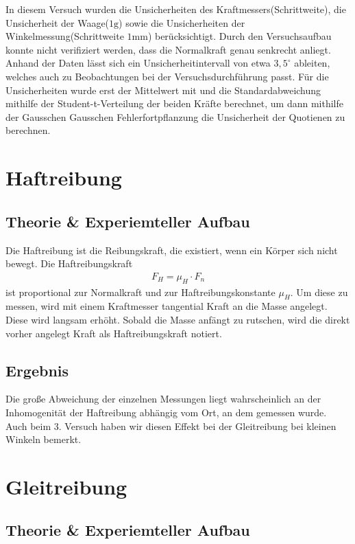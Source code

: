 \documentclass[11pt, a4paper]{article}
\begin{document}
    In diesem Versuch wurden die Unsicherheiten des Kraftmessers(Schrittweite), die Unsicherheit der Waage($1\si{\gram}$)
    sowie die Unsicherheiten der Winkelmessung(Schrittweite $1 \si{\milli\metre}$) berücksichtigt.
    Durch den Versuchsaufbau konnte nicht verifiziert werden, dass die Normalkraft genau senkrecht anliegt.
    Anhand der Daten lässt sich ein Unsicherheitintervall von etwa $3,5^{\circ}$ ableiten, welches auch zu
    Beobachtungen bei der Versuchsdurchführung passt. Für die Unsicherheiten wurde erst der Mittelwert \cite[(29)]{ABW} mit
    und die Standardabweichung mithilfe der Student-t-Verteilung \cite[(15)]{ABW} der beiden Kräfte berechnet, um dann mithilfe der Gausschen
    Gausschen Fehlerfortpflanzung \cite[(19)]{ABW} die Unsicherheit der Quotienen zu berechnen.

    \section{Haftreibung}
    \subsection{Theorie \& Experiemteller Aufbau}
    Die Haftreibung ist die Reibungskraft, die existiert, wenn ein Körper sich nicht bewegt.
    Die Haftreibungskraft
    \begin{align}
        F_H = \mu_H \cdot F_n
    \end{align}
    ist proportional zur Normalkraft und zur Haftreibungskonstante $\mu_H$. Um diese zu messen,
    wird mit einem Kraftmesser tangential Kraft an die Masse angelegt. Diese wird langsam erhöht.
    Sobald die Masse anfängt zu rutschen, wird die direkt vorher angelegt Kraft als Haftreibungskraft notiert.

    \subsection{Ergebnis}

    Die große Abweichung der einzelnen Messungen liegt wahrscheinlich an der Inhomogenität der Haftreibung
    abhängig vom Ort, an dem gemessen wurde.
    Auch beim 3. Versuch haben wir diesen Effekt bei der Gleitreibung bei kleinen Winkeln bemerkt.

    \section{Gleitreibung}

    \subsection{Theorie \& Experiemteller Aufbau}
\end{document}
